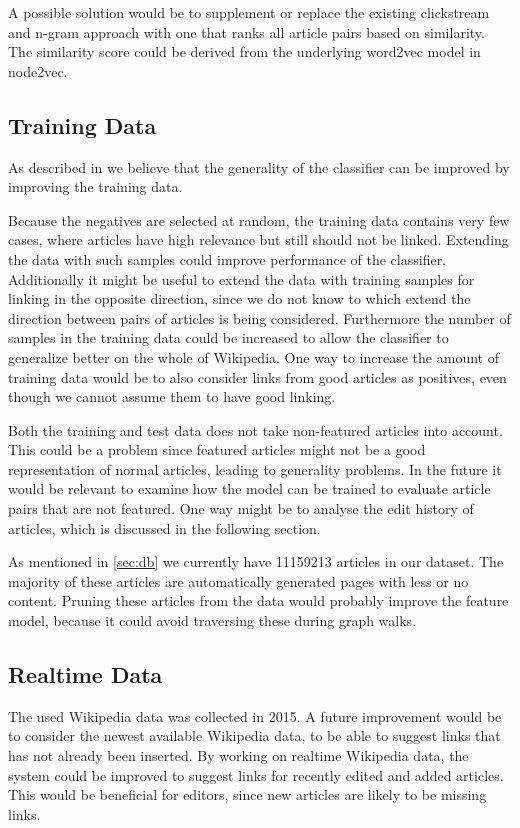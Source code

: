 A possible solution would be to supplement or replace the existing clickstream and n-gram approach with one that ranks all article pairs based on similarity. The similarity score could be derived from the underlying word2vec model in node2vec.

\subsection{Training Data}
As described in  we believe that the generality of the classifier can be improved by improving the training data.

Because the negatives are selected at random, the training data contains very few cases, where articles have high relevance but still should not be linked. Extending the data with such samples could improve performance of the classifier. Additionally it might be useful to extend the data with training samples for linking in the opposite direction, since we do not know to which extend the direction between pairs of articles is being considered. Furthermore the number of samples in the training data could be increased to allow the classifier to generalize better on the whole of Wikipedia. One way to increase the amount of training data would be to also consider links from good articles as positives, even though we cannot assume them to have good linking.

Both the training and test data does not take non-featured articles into account. This could be a problem since featured articles might not be a good representation of normal articles, leading to generality problems. In the future it would be relevant to examine how the model can be trained to evaluate article pairs that are not featured. One way might be to analyse the edit history of articles, which is discussed in the following section. %

As mentioned in \cref{sec:db} we currently have \num{11159213} articles in our dataset. The majority of these articles are automatically generated pages with less or no content. Pruning these articles from the data would probably improve the feature model, because it could avoid traversing these during graph walks.

\subsection{Realtime Data}
The used Wikipedia data was collected in 2015. A future improvement would be to consider the newest available Wikipedia data, to be able to suggest links that has not already been inserted.
By working on realtime Wikipedia data, the system could be improved to suggest links for recently edited and added articles. This would be beneficial for editors, since new articles are likely to be missing links.

